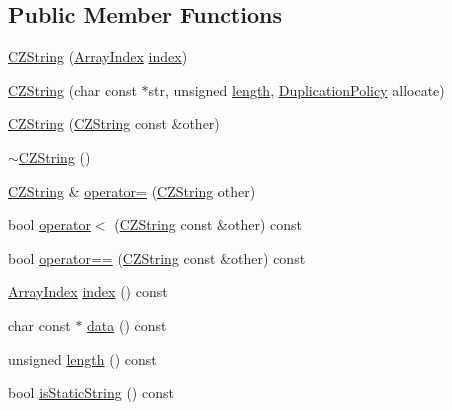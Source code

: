 \subsection*{Public Member Functions}
\begin{DoxyCompactItemize}
\item 
\hyperlink{class_json_1_1_value_1_1_c_z_string_a4b8aa6eaabdec78cffec96e088da996f}{C\+Z\+String} (\hyperlink{class_json_1_1_value_a184a91566cccca7b819240f0d5561c7d}{Array\+Index} \hyperlink{class_json_1_1_value_1_1_c_z_string_a0f3ba09401525d4f01dafd577122ee32}{index})
\item 
\hyperlink{class_json_1_1_value_1_1_c_z_string_a86a86eaf0cf26d4c861d0daa359d608a}{C\+Z\+String} (char const $\ast$str, unsigned \hyperlink{class_json_1_1_value_1_1_c_z_string_aa7ee665d162c1f33b3ec818e289d8a5e}{length}, \hyperlink{class_json_1_1_value_1_1_c_z_string_a2805c46fb4a72bbaed55de6d75941b6d}{Duplication\+Policy} allocate)
\item 
\hyperlink{class_json_1_1_value_1_1_c_z_string_a9685070d440335b55ef5c85747d25157}{C\+Z\+String} (\hyperlink{class_json_1_1_value_1_1_c_z_string}{C\+Z\+String} const \&other)
\item 
\hyperlink{class_json_1_1_value_1_1_c_z_string_add6989dc7073646b95e5ebacb3f07d51}{$\sim$\+C\+Z\+String} ()
\item 
\hyperlink{class_json_1_1_value_1_1_c_z_string}{C\+Z\+String} \& \hyperlink{class_json_1_1_value_1_1_c_z_string_a6513ff431b0593d5744868dfee739f7b}{operator=} (\hyperlink{class_json_1_1_value_1_1_c_z_string}{C\+Z\+String} other)
\item 
bool \hyperlink{class_json_1_1_value_1_1_c_z_string_ae023bb91b4b4520c82d5e6e4da8c310a}{operator$<$} (\hyperlink{class_json_1_1_value_1_1_c_z_string}{C\+Z\+String} const \&other) const
\item 
bool \hyperlink{class_json_1_1_value_1_1_c_z_string_ad41766c98fc6a6d5fcd72aaf78fc5db0}{operator==} (\hyperlink{class_json_1_1_value_1_1_c_z_string}{C\+Z\+String} const \&other) const
\item 
\hyperlink{class_json_1_1_value_a184a91566cccca7b819240f0d5561c7d}{Array\+Index} \hyperlink{class_json_1_1_value_1_1_c_z_string_a0f3ba09401525d4f01dafd577122ee32}{index} () const
\item 
char const  $\ast$ \hyperlink{class_json_1_1_value_1_1_c_z_string_af6eee54f8dc43a1203d5af6ba0a5c9a2}{data} () const
\item 
unsigned \hyperlink{class_json_1_1_value_1_1_c_z_string_aa7ee665d162c1f33b3ec818e289d8a5e}{length} () const
\item 
bool \hyperlink{class_json_1_1_value_1_1_c_z_string_a5991dfa2f6c2ba318373c7429fcd7a57}{is\+Static\+String} () const
\end{DoxyCompactItemize}
